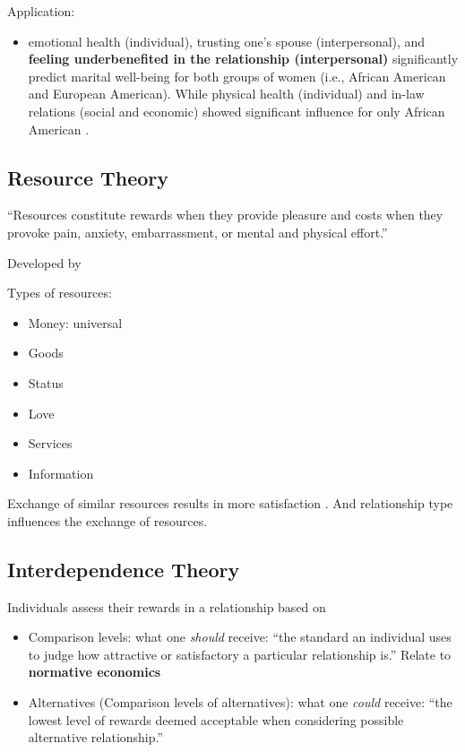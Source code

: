 \documentclass[
]{book}
\providecommand{\tightlist}{%
  \setlength{\itemsep}{0pt}\setlength{\parskip}{0pt}}
\begin{document}
Application:

\begin{itemize}
\tightlist
\item
  emotional health (individual), trusting one's spouse (interpersonal), and \textbf{feeling underbenefited in the
  relationship (interpersonal)} significantly predict marital well-being for both groups of women (i.e., African
  American and European American). While physical health (individual) and in-law relations (social and economic)
  showed significant influence for only African American \citep{Goodwin_2003}.
\end{itemize}

\hypertarget{resource-theory}{%
\subsection{Resource Theory}\label{resource-theory}}

``Resources constitute rewards when they provide pleasure and costs when they provoke pain, anxiety, embarrassment, or
mental and physical effort.''

Developed by \citep{Foa_1980, Foa_2012}

Types of resources:

\begin{itemize}
\tightlist
\item
  Money: universal
\item
  Goods
\item
  Status
\item
  Love
\item
  Services
\item
  Information
\end{itemize}

Exchange of similar resources results in more satisfaction \citep{Foa_1980}. And relationship type influences the exchange of
resources.

\hypertarget{interdependence-theory}{%
\subsection{Interdependence Theory}\label{interdependence-theory}}

Individuals assess their rewards in a relationship based on

\begin{itemize}
\tightlist
\item
  Comparison levels: what one \emph{should} receive: ``the standard an individual uses to judge how attractive or
  satisfactory a particular relationship is.'' Relate to \textbf{normative economics}
\item
  Alternatives (Comparison levels of alternatives): what one \emph{could} receive: ``the lowest level of rewards deemed
  acceptable when considering possible alternative relationship.''
\end{itemize}
\end{document}
